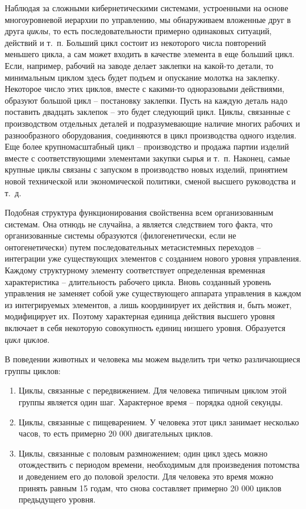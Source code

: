 \documentclass{book}
\begin{document}
Наблюдая за сложными кибернетическими системами, устроенными на основе многоуровневой иерархии по управлению, мы обнаруживаем вложенные друг в друга \textit{циклы},  то есть последовательности примерно одинаковых ситуаций, действий и т.~п. Больший цикл состоит из некоторого числа повторений меньшего цикла, а сам может входить в качестве элемента в еще больший цикл. Если, например, рабочий на заводе делает заклепки на какой-то детали, то минимальным циклом здесь будет подъем и опускание молотка на заклепку. Некоторое число этих циклов, вместе с какими-то одноразовыми действиями, образуют большой цикл -- постановку заклепки. Пусть на каждую деталь надо поставить двадцать заклепок -- это будет следующий цикл. Циклы, связанные с производством отдельных деталей и подразумевающие наличие многих рабочих и разнообразного оборудования, соединяются в цикл произ­водства одного изделия. Еще более крупномасштабный цикл -- производство и продажа партии изделий вместе с соответствую­щими элементами закупки сырья и т.~п. 
Наконец, 
самые крупные циклы связаны с запуском в производство новых изделий, принятием новой технической или экономической политики, сменой высшего руководства и т.~д.

Подобная структура функционирования свойственна всем организованным системам. Она отнюдь не случайна, а являет­ся следствием того факта, что организованные системы образуются (филогенетически, если не онтогенетически) путем последовательных метасистемных переходов -- интеграции уже существующих элементов с созданием нового уровня управления. Каждому структурному элементу соответствует определенная временная характеристика -- длительность рабочего цик­ла. Вновь созданный уровень управления не заменяет собой уже существующего аппарата управления в каждом из интегрируемых элементов, а лишь координирует их действия и, быть может, модифицирует их. Поэтому характерная единица действия высшего уровня включает в себя некоторую совокуп­ность единиц низшего уровня. Образуется \textit{цикл циклов}. 

В поведении животных и человека мы можем выделить три четко различающиеся группы циклов:
\begin{enumerate}
 \item Циклы, связанные с передвижением. Для человека типич­ным циклом этой группы является один шаг. Характерное время -- порядка одной секунды.
 \item Циклы, связанные с пищеварением. У человека этот цикл занимает несколько часов, то есть примерно 20 000 двигатель­ных циклов.
 \item Циклы, связанные с половым размножением; один цикл здесь можно отождествить с периодом времени, необходимым для произведения потомства и доведением его до половой зрелости. Для человека это время можно принять равным 15 годам, что снова составляет примерно 20 000 циклов преды­дущего уровня.
\end{enumerate}
\end{document}
